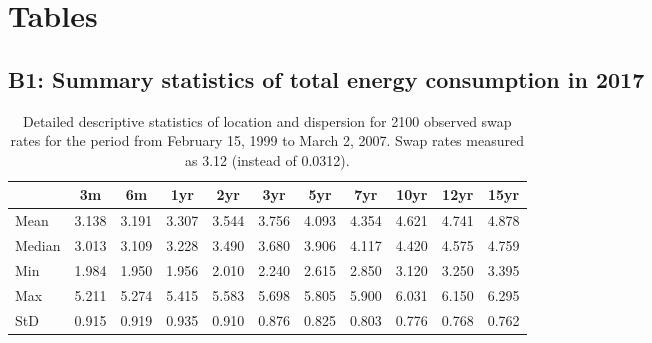 
\section{Tables}\label{App:Tables}

\subsection{B1: Summary statistics of total energy consumption in 2017} \label{App:Tables:totalcons}




\begin{table}[ht]
    \begin{center}
        {\footnotesize
        \begin{tabular}{l|cccccccccc}
        \hline \hline
                        & 3m    & 6m    & 1yr   & 2yr   & 3yr   & 5yr   & 7yr   & 10yr  & 12yr  & 15yr   \\
            \hline
                Mean   & 3.138 & 3.191 & 3.307 & 3.544 & 3.756 & 4.093 & 4.354 & 4.621 & 4.741 & 4.878  \\
                Median & 3.013 & 3.109 & 3.228 & 3.490 & 3.680 & 3.906 & 4.117 & 4.420 & 4.575 & 4.759  \\
                Min    & 1.984 & 1.950 & 1.956 & 2.010 & 2.240 & 2.615 & 2.850 & 3.120 & 3.250 & 3.395  \\
                Max    & 5.211 & 5.274 & 5.415 & 5.583 & 5.698 & 5.805 & 5.900 & 6.031 & 6.150 & 6.295  \\
                StD    & 0.915 & 0.919 & 0.935 & 0.910 & 0.876 & 0.825 & 0.803 & 0.776 & 0.768 & 0.762  \\
            \hline \hline
        \end{tabular}}
    \end{center}
    \caption{Detailed descriptive statistics of location and dispersion for
    2100 observed swap rates for the period from
    February 15, 1999 to March 2, 2007. Swap rates measured as 3.12 (instead of 0.0312).}
    \label{Tab:DescripStatsRawDataDetail}
\end{table}
